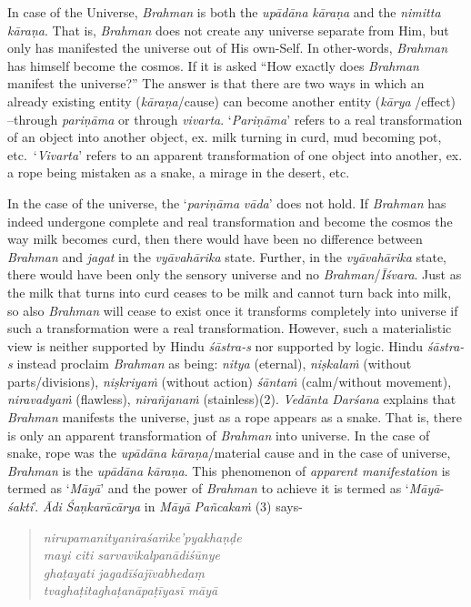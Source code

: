 In case of the Universe, \emph{Brahman} is both the \emph{upādāna} \emph{kāraṇa} and the \emph{nimitta} \emph{kāraṇa}. That is, \emph{Brahman} does not create any universe separate from Him, but only has manifested the universe out of His own-Self. In other-words, \emph{Brahman} has himself become the cosmos. If it is asked ``How exactly does \emph{Brahman} manifest the universe?'' The answer is that there are two ways in which an already existing entity (\emph{kāraṇa}/cause) can become another entity (\emph{kārya} /effect) --through \emph{pariṇāma} or through \emph{vivarta}. `\emph{Pariṇāma}' refers to a real transformation of an object into another object, ex. milk turning in curd, mud becoming pot, etc.\ `\emph{Vivarta}' refers to an apparent transformation of one object into another, ex. a rope being mistaken as a snake, a mirage in the desert, etc.

In the case of the universe, the `\emph{pariṇāma} \emph{vāda}' does not hold. If \emph{Brahman} has indeed undergone complete and real transformation and become the cosmos the way milk becomes curd, then there would have been no difference between \emph{Brahman} and \emph{jagat} in the \emph{vyāvahārika} state. Further, in the \emph{vyāvahārika} state, there would have been only the sensory universe and no \emph{Brahman}/\emph{Īśvara}. Just as the milk that turns into curd ceases to be milk and cannot turn back into milk, so also \emph{Brahman} will cease to exist once it transforms completely into universe if such a transformation were a real transformation. However, such a materialistic view is neither supported by Hindu \emph{śāstra-s} nor supported by logic. Hindu \emph{śāstra-s} instead proclaim \emph{Brahman} as being: \emph{nitya} (eternal), \emph{niṣkalaṁ} (without parts/divisions), \emph{niṣkriyaṁ} (without action) \emph{śāntaṁ} (calm/without movement), \emph{niravadyaṁ} (flawless), \emph{nirañjanaṁ} (stainless)(2). \emph{Vedānta} \emph{Darśana} explains that \emph{Brahman} manifests the universe, just as a rope appears as a snake. That is, there is only an apparent transformation of \emph{Brahman} into universe. In the case of snake, rope was the \emph{upādāna} \emph{kāraṇa}/material cause and in the case of universe, \emph{Brahman} is the \emph{upādāna} \emph{kāraṇa}. This phenomenon of \emph{apparent manifestation} is termed as `\emph{Māyā}' and the power of \emph{Brahman} to achieve it is termed as `\emph{Māyā}-\emph{śakti}'. \emph{Ādi} \emph{Śaṇkarācārya} in \emph{Māyā} \emph{Pañcakaṁ} (3) says-

\begin{verse}
\emph{nirupamanityaniraśaṁke'pyakhaṇḍe}\\
\emph{mayi citi sarvavikalpanādiśūnye }\\
\emph{ghaṭayati jagadīśajīvabhedaṃ}\\
\emph{tvaghaṭitaghaṭanāpaṭīyasī māyā }
\end{verse}
\newpage

